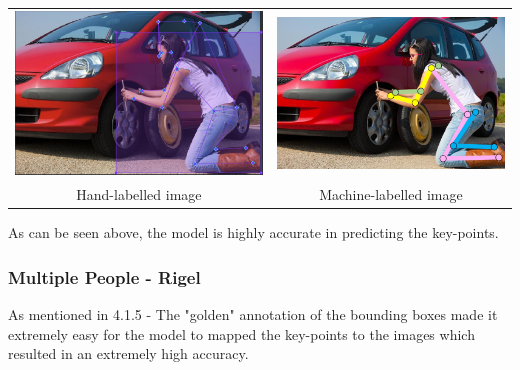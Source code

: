 \documentclass[a4paper,12pt]{article}
\begin{document}
\begin{center}
\begin{tabular}{cc}
\includegraphics[scale=0.2]{Shreyas_Hand_labelled.png}
&
\includegraphics[scale=0.32]{Shreyas_machine_labelled.png}
\\
Hand-labelled image & Machine-labelled image
\end{tabular}
\end{center}

As can be seen above, the model is highly accurate in predicting the key-points.

\subsubsection{Multiple People - Rigel}

As mentioned in 4.1.5 - The "golden" annotation of the bounding boxes made it extremely easy for the model to mapped the key-points to the images which resulted in an extremely high accuracy.  
\end{document}
